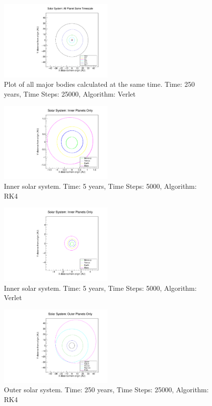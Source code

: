 \documentclass[a4paper,12pt]{report}
\begin{document}
 \begin{figure}
 \centering
   \includegraphics[width=0.5\textwidth]{all_bodies_same_time_Verlet.pdf}
  \caption{Plot of all major bodies calculated at the same time. Time: 250 years, Time Steps: 25000, Algorithm: Verlet}
  \label{fig:all_bodies_same_time_Verlet}
 \end{figure}
 
  \begin{figure}
 \centering
   \includegraphics[width=0.5\textwidth]{inner_only_RK4.pdf}
  \caption{Inner solar system. Time: 5 years, Time Steps: 5000, Algorithm: RK4}
  \label{fig:inner_only_RK4}
 \end{figure}
 
   \begin{figure}
 \centering
   \includegraphics[width=0.5\textwidth]{inner_only_Verlet.pdf}
  \caption{Inner solar system. Time: 5 years, Time Steps: 5000, Algorithm: Verlet}
  \label{fig:inner_only_Verlet}
 \end{figure}
 
  \begin{figure}
 \centering
   \includegraphics[width=0.5\textwidth]{outer_only_RK4.pdf}
  \caption{Outer solar system. Time: 250 years, Time Steps: 25000, Algorithm: RK4}
  \label{fig:outer_only_RK4}
 \end{figure}
 
\end{document}
